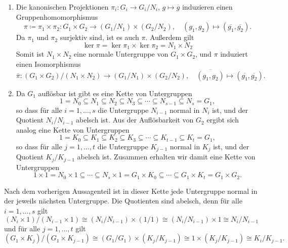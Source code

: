 \begin{solution}
  \begin{enumerate}
    \item
      Die kanonischen Projektionen $\pi_i \colon G_i \to G_i/N_i$, $g \mapsto \overline{g}$ induzieren einen Gruppenhomomorphismus
      \[
        \pi
        \coloneqq
                \pi_1 \times \pi_2
        \colon  G_1 \times G_2
        \to     (G_1/N_1) \times (G_2/N_2),
        \quad
                (g_1, g_2)
        \mapsto (\overline{g_1}, \overline{g_2}).
      \]
      Da $\pi_1$ und $\pi_2$ surjektiv sind, ist es auch $\pi$.
      Außerdem gilt
      \[
          \ker \pi
        = \ker \pi_1 \times \ker \pi_2
        = N_1 \times N_2
      \]
      Somit ist $N_1 \times N_2$ eine normale Untergruppe von $G_1 \times G_2$, und $\pi$ induziert einen Isomorphismus
      \[
                \overline{\pi}
        \colon  (G_1 \times G_2)/(N_1 \times N_2)
        \to     (G_1/N_1) \times (G_2/N_2),
        \quad
                \overline{(g_1, g_2)}
        \mapsto (\overline{g_1}, \overline{g_2}).
      \]
      
    \item
      Da $G_1$ auflösbar ist gibt es eine Kette von Untergruppen
      \[
                  1
        =         N_0
        \subseteq N_1
        \subseteq N_2
        \subseteq N_3
        \subseteq \dotsb
        \subseteq N_{s-1}
        \subseteq N_s
        =         G_1,
      \]
      so dass für alle $i = 1, \dotsc, s$ die Untergruppe $N_{i-1}$ normal in $N_i$ ist, und der Quotient $N_i/N_{i-1}$ abelsch ist.
      Aus der Auflösbarkeit von $G_2$ ergibt sich analog eine Kette von Untergruppen
      \[
                  1
        =         K_0
        \subseteq K_1
        \subseteq K_2
        \subseteq K_3
        \subseteq \dotsb
        \subseteq K_{t-1}
        \subseteq K_t
        =         G_1,
      \]
      so dass für alle $j = 1, \dotsc, t$ die Untergruppe $K_{j-1}$ normal in $K_j$ ist, und der Quotient $K_j/K_{j-1}$ abelsch ist.
      Zusammen erhalten wir damit eine Kette von Untergruppen
      \[
                  1       \times 1
        =         N_0     \times 1
        \subseteq \dotsb
        \subseteq N_s     \times 1
        =         G_1     \times K_0
        \subseteq \dotsb
        \subseteq G_1     \times K_t
        =         G_1     \times G_2.
      \]
  \end{enumerate}
  Nach dem vorherigen Aussagenteil ist in dieser Kette jede Untergruppe normal in der jeweils nächsten Untergruppe.
  Die Quotienten sind abelsch, denn für alle $i = 1, \dotsc, s$ gilt
  \[
          (N_i \times 1)/(N_{i-1} \times 1)
    \cong (N_i/N_{i-1}) \times (1 / 1)
    \cong (N_i/N_{i-1}) \times 1
    \cong N_i/N_{i-1}
  \]
  und für alle $j = 1, \dotsc, t$ gilt
  \[
          (G_1 \times K_j)/(G_1 \times K_{j-1})
    \cong (G_1/G_1) \times (K_j/K_{j-1})
    \cong 1 \times (K_j/K_{j-1})
    \cong K_i/K_{j-1}.
  \]
\end{solution}


